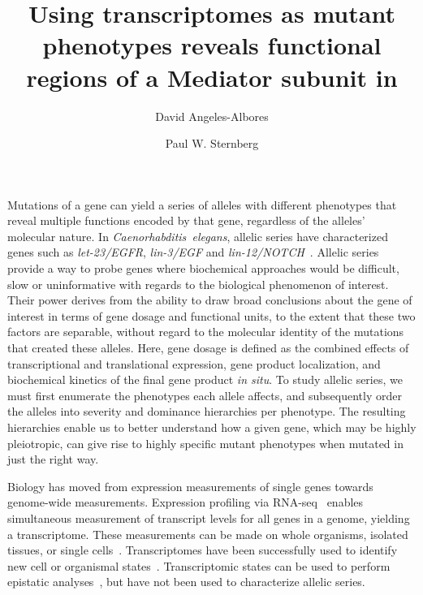 \documentclass[9pt,twocolumn,twoside]{gsajnl}
\title{Using transcriptomes as mutant phenotypes reveals functional regions of a
       Mediator subunit in \cel{}}
\author[$\dagger$]{David Angeles-Albores}
\author[$\dagger$,1]{Paul W. Sternberg}
\affil[$\dagger$]{Division of Biology and Biological Engineering, Caltech,
Pasadena, CA, 91125, USA}
\newcommand{\gene}[1]{\mbox{\emph{#1}}}
\begin{document}
\maketitle{}
\thispagestyle{firststyle}
\marginmark{}
\firstpagefootnote{}
\vspace{-11pt}%

\linenumbers{}
\lettrine[lines=2]{\color{color2}M}{}utations of a gene can yield a series of
alleles with different phenotypes that reveal multiple functions encoded by that
gene, regardless of the alleles' molecular nature. In
\emph{Caenorhabditis~elegans}, allelic series have characterized genes such as
\gene{let-23/EGFR}, \gene{lin-3/EGF} and \gene{lin-12/NOTCH}~\citep{Aroian1991,
Ferguson1985a, Greenwald1983}. Allelic series provide a way to probe
genes where biochemical approaches would be difficult, slow or uninformative
with regards to the biological phenomenon of interest. Their power derives from
the ability to draw broad conclusions about the gene of interest in terms of
gene dosage and functional units, to the extent that these two factors are
separable, without regard to the molecular identity of the mutations that
created these alleles. Here, gene dosage is defined as the combined effects of
transcriptional and translational expression, gene product localization, and
biochemical kinetics of the final gene product \emph{in situ}. To study allelic
series, we must first enumerate the phenotypes each allele affects, and
subsequently order the alleles into severity and dominance hierarchies per
phenotype. The resulting hierarchies enable us to better understand how a given
gene, which may be highly pleiotropic, can give rise to highly specific mutant
phenotypes when mutated in just the right way.

Biology has moved from expression measurements of single genes towards
genome-wide measurements. Expression profiling via RNA-seq~\citep{Mortazavi2008}
enables simultaneous measurement of transcript levels for all genes in a genome,
yielding a transcriptome. These measurements can be made on whole organisms,
isolated tissues, or single cells~\citep{Tang2009,Schwarz2012}. Transcriptomes
have been successfully used to identify new cell or organismal
states~\citep{Angeles-Albores2017,Villani2017}. Transcriptomic states can be
used to perform epistatic analyses~\citep{Dixit2016,AngelesAlboresHIF},
but have not been used to characterize allelic series.
\end{document}
